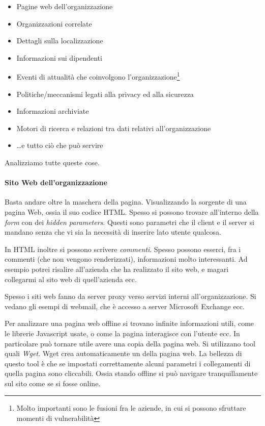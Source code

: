 \documentclass[14pt]{extreport}
\begin{document}
\begin{itemize}
    \item Pagine web dell'organizzazione
    \item Organizzazioni correlate
    \item Dettagli sulla localizzazione
    \item Informazioni sui dipendenti
    \item Eventi di attualità che coinvolgono l'organizzazione\footnote{Molto importanti sono le fusioni fra le aziende, in cui si possono sfruttare momenti di vulnerabilità}
    \item Politiche/meccanismi legati alla privacy ed alla sicurezza
    \item Informazioni archiviate
    \item Motori di ricerca e relazioni tra dati relativi all'organizzazione
    \item \ldots e tutto ciò che può servire
\end{itemize}
Analizziamo tutte queste cose.


\paragraph{Sito Web dell'organizzazione}
Basta andare oltre la maschera della pagina. Visualizzando la sorgente di una pagina Web, ossia il suo codice HTML. Spesso si possono trovare all'interno della \textit{form} con dei \textit{hidden parameters}. Questi sono parametri che il client e il server si mandano senza che vi sia la necessità di inserire lato utente qualcosa.

In HTML inoltre si possono scrivere \textit{commenti}. Spesso possono esserci, fra i commenti (che non vengono renderizzati), informazioni molto interessanti. Ad esempio potrei risalire all'azienda che ha realizzato il sito web, e magari collegarmi al sito web di quell'azienda ecc.

Spesso i siti web fanno da server proxy verso servizi interni all'organizzazione. Si vedano gli esempi di webmail, che è accesso a server Microsoft Exchange ecc.\newline


Per analizzare una pagina web offline si trovano infinite informazioni utili, come le librerie Javascript usate, o come la pagina interagisce con l'utente ecc.
In particolare può tornare utile avere una copia della pagina web. Si utilizzano tool quali \textit{Wget}. Wget crea automaticamente un  della pagina web.
La bellezza di questo tool è che se impostati correttamente alcuni parametri i collegamenti di quella pagina sono cliccabili. Ossia stando offline si può navigare tranquillamente sul sito come se si fosse online.
\end{document}
